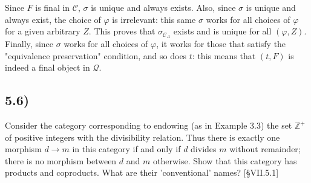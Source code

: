 
Since $F$ is final in $\mathcal{C}$, $\sigma$ is unique and always exists. Also, since $\sigma$ is unique and always exist, the choice of $\varphi$ is irrelevant: this same $\sigma$ works for all choices of $\varphi$ for a given arbitrary $Z$. This proves that $\sigma_{\mathcal{C}_A}$ exists and is unique for all $(\varphi, Z)$. Finally, since $\sigma$ works for all choices of $\varphi$, it works for those that satisfy the "equivalence preservation" condition, and so does $t$: this means that $(t, F)$ is indeed a final object in $\mathcal{Q}$.






\subsection*{5.6)}

Consider the category corresponding to endowing (as in Example 3.3) the set $\mathbb{Z}^+$ of positive integers with the divisibility relation. Thus there is exactly one morphism $d \to m$ in this category if and only if $d$ divides $m$ without remainder; there is no morphism between $d$ and $m$ otherwise. Show that this category has products and coproducts. What are their 'conventional' names? [§VII.5.1]


